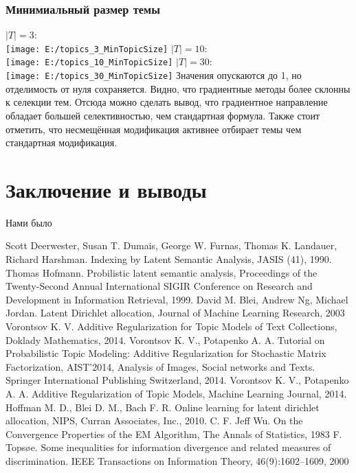 \documentclass[12pt]{article}
\begin{document}
\subsubsection{Минимиальный размер темы}
$|T| = 3$:\\
\texttt{[image: E:/topics\_3\_MinTopicSize]}
$|T| = 10$:\\
\texttt{[image: E:/topics\_10\_MinTopicSize]}
\newpage
$|T| = 30$:\\
\texttt{[image: E:/topics\_30\_MinTopicSize]}
Значения опускаются до 1, но отделимость от нуля сохраняется.  Видно, что градиентные методы более склонны к селекции тем. Отсюда можно сделать вывод, что градиентное направление обладает большей селективностью, чем стандартная формула. Также стоит отметить, что несмещённая модификация активнее отбирает темы чем стандартная модификация.
\section{Заключение и выводы}
	Нами было
\newpage
	\begin{thebibliography}{@@@@}
		Scott Deerwester, Susan T. Dumais, George W. Furnas, Thomas K. Landauer, Richard Harshman. Indexing by Latent Semantic Analysis,  JASIS (41), 1990.
		Thomas Hofmann. Probilistic latent semantic analysis, Proceedings of the Twenty-Second Annual International SIGIR Conference on Research and Development in Information Retrieval, 1999.
		David M. Blei, Andrew Ng, Michael Jordan. Latent Dirichlet allocation, Journal of Machine Learning Research,  2003
		Vorontsov K. V. Additive Regularization for Topic Models of Text Collections, Doklady Mathematics, 2014.
		Vorontsov K. V., Potapenko A. A. Tutorial on Probabilistic Topic Modeling: Additive Regularization for Stochastic Matrix Factorization,  AIST’2014, Analysis of Images, Social networks and Texts. Springer International Publishing Switzerland, 2014.
		Vorontsov K. V., Potapenko A. A. Additive Regularization of Topic Models, Machine Learning Journal, 2014.
		Hoffman M. D., Blei D. M., Bach F. R. Online learning for latent dirichlet allocation, NIPS, Curran Associates, Inc., 2010.
		C. F. Jeff Wu. On the Convergence Properties of the EM Algorithm, The Annals of Statistics, 1983
		F. Topsøe. Some inequalities for information divergence and related measures of discrimination. IEEE Transactions on Information Theory, 46(9):1602–1609, 2000
	\end{thebibliography}
\end{document}

